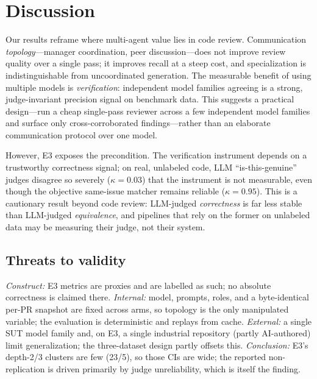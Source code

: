 \documentclass[conference]{IEEEtran}
\begin{document}
\section{Discussion}
Our results reframe where multi-agent value lies in code review. Communication
\emph{topology}---manager coordination, peer discussion---does not improve review
quality over a single pass; it improves recall at a steep cost, and specialization
is indistinguishable from uncoordinated generation. The measurable benefit of
using multiple models is \emph{verification}: independent model families agreeing
is a strong, judge-invariant precision signal on benchmark data. This suggests a
practical design---run a cheap single-pass reviewer across a few independent model
families and surface only cross-corroborated findings---rather than an elaborate
communication protocol over one model.

However, E3 exposes the precondition. The verification instrument depends on a
trustworthy correctness signal; on real, unlabeled code, LLM ``is-this-genuine''
judges disagree so severely ($\kappa{=}0.03$) that the instrument is not
measurable, even though the objective same-issue matcher remains reliable
($\kappa{=}0.95$). This is a cautionary result beyond code review: LLM-judged
\emph{correctness} is far less stable than LLM-judged \emph{equivalence}, and
pipelines that rely on the former on unlabeled data may be measuring their judge,
not their system.

\subsection{Threats to validity}
\emph{Construct:} E3 metrics are proxies and are labelled as such; no absolute
correctness is claimed there. \emph{Internal:} model, prompts, roles, and a
byte-identical per-PR snapshot are fixed across arms, so topology is the only
manipulated variable; the evaluation is deterministic and replays from cache.
\emph{External:} a single SUT model family and, on E3, a single industrial
repository (partly AI-authored) limit generalization; the three-dataset design
partly offsets this. \emph{Conclusion:} E3's depth-2/3 clusters are few (23/5),
so those CIs are wide; the reported non-replication is driven primarily by judge
unreliability, which is itself the finding.
\end{document}
